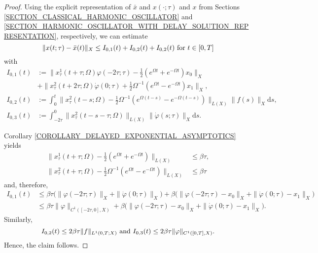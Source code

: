 \documentclass[12pt]{article}
\numberwithin{equation}{section}
\numberwithin{equation}{section}
\begin{document}
	\begin{proof}
		Using the explicit representation of $\bar{x}$ and $x(\cdot; \tau)$ and $x$ from Sections \ref{SECTION_CLASSICAL_HARMONIC_OSCILLATOR} and \ref{SECTION_HARMONIC_OSCILLATOR_WITH_DELAY_SOLUTION_REPRESENTATION},
		respectively, we can estimate
		\begin{equation}
			\|x(t; \tau) - \bar{x}(t)\|_{X} \leq
			I_{0, 1}(t) + I_{0, 2}(t) + I_{0, 2}(t) \text{ for } t \in [0, T] \notag
		\end{equation}
		with
		\begin{align*}
			I_{0, 1}(t) &:= \big\|x_{\tau}^{1}(t + \tau; \Omega) \varphi(-2\tau; \tau) - \tfrac{1}{2} (e^{\Omega t} + e^{-\Omega t}) x_{0}\big\|_{X} \\
			&+ \big\|x_{\tau}^{2}(t + 2\tau; \Omega) \dot{\varphi}(0; \tau) + \tfrac{1}{2} \Omega^{-1}(e^{\Omega t} - e^{-\Omega t}) x_{1}\big\|_{X}, \\
						I_{0, 2}(t) &:= \int_{0}^{t} \big\|x^{2}_{\tau}(t - s; \Omega) - \tfrac{1}{2} \Omega^{-1} (e^{\Omega(t - s)} - e^{-\Omega (t -s)})\big\|_{L(X)} \|f(s)\|_{X} \mathrm{d}s, \\
						I_{0, 3}(t) &:= \int_{-2\tau}^{0} \|x_{\tau}^{2}( t - s - \tau; \Omega)\|_{L(X)} \|\dot{\varphi}(s; \tau)\|_{X} \mathrm{d}s.
		\end{align*}

		Corollary \ref{COROLLARY_DELAYED_EXPONENTIAL_ASYMPTOTICS} yields
		\begin{align*}
			\big\|x_{\tau}^{1}(t + \tau; \Omega) - \tfrac{1}{2} (e^{\Omega t} + e^{-\Omega t})\big\|_{L(X)} &\leq \beta \tau, \\
			\big\|x_{\tau}^{2}(t + \tau; \Omega) - \tfrac{1}{2} \Omega^{-1} (e^{\Omega t} - e^{-\Omega t})\big\|_{L(X)} &\leq \beta \tau
		\end{align*}
		and, therefore,
		\begin{align*}
			I_{0, 1}(t) &\leq \beta \tau \big(\|\varphi(-2\tau; \tau)\|_{X} + \|\dot{\varphi}(0; \tau)\|_{X}\big) + \beta\big(\|\varphi(-2\tau; \tau) - x_{0}\|_{X} + \|\dot{\varphi}(0; \tau) - x_{1}\|_{X}\big) \\
			&\leq \beta \tau \|\varphi\|_{C^{1}([-2\tau, 0], X)} + \beta \big(\|\varphi(-2\tau; \tau) - x_{0}\|_{X} + \|\dot{\varphi}(0; \tau) - x_{1}\|_{X}\big).
		\end{align*}
		Similarly,
		\begin{equation}
			I_{0, 2}(t) \leq 2 \beta \tau \|f\|_{L^{1}(0, T; X)} \text{ and }
			I_{0, 3}(t) \leq 2 \beta \tau \|\varphi\|_{C^{1}([0, T], X)}. \notag
		\end{equation}
		Hence, the claim follows.
	\end{proof}
\end{document}
